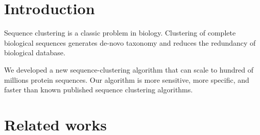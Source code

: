 \documentclass[]{article}
\title{}
\author{}
\begin{document}
\maketitle

\begin{abstract}

\end{abstract}

\section{Introduction}

Sequence clustering is a classic problem in biology.
Clustering of complete biological sequences generates de-novo taxonomy and reduces the redundancy of biological database.

We developed a new sequence-clustering algorithm that can scale to hundred of millions protein sequences.
Our algorithm is more sensitive, more specific, and faster than known published sequence clustering algorithms.

\section{Related works}
\end{document}
